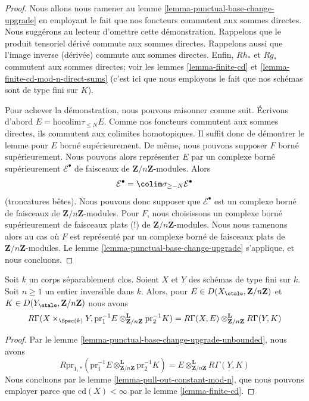 \begin{proof}
Nous allons nous ramener au
lemme \ref{lemma-punctual-base-change-upgrade}
en employant le fait que nos foncteurs commutent aux sommes directes.
Nous suggérons au lecteur d'omettre cette démonstration.
Rappelons que le produit tensoriel dérivé commute aux
sommes directes. Rappelons aussi que l'image inverse (dérivée) commute aux sommes directes.
Enfin, $Rh_*$ et $Rg_*$ commutent aux sommes directes; voir les
lemmes \ref{lemma-finite-cd} et
\ref{lemma-finite-cd-mod-n-direct-sums}
(c'est ici que nous employons le fait que nos schémas sont de type fini
sur $K$).

\medskip\noindent
Pour achever la démonstration, nous pouvons raisonner comme suit.
Écrivons d'abord $E = \text{hocolim} \tau_{\leq N} E$.
Comme nos foncteurs commutent aux sommes directes, ils commutent
aux colimites homotopiques. Il suffit donc de démontrer
le lemme pour $E$ borné supérieurement. De même, nous pouvons
supposer $F$ borné supérieurement.
Nous pouvons alors représenter $E$ par un complexe borné supérieurement
$\mathcal{E}^\bullet$ de faisceaux de $\mathbf{Z}/n\mathbf{Z}$-modules.
Alors
$$
\mathcal{E}^\bullet = \colim \sigma_{\geq -N}\mathcal{E}^\bullet
$$
(troncatures bêtes).
Nous pouvons donc supposer que $\mathcal{E}^\bullet$ est un complexe
borné de faisceaux de $\mathbf{Z}/n\mathbf{Z}$-modules.
Pour $F$, nous choisissons un complexe borné supérieurement de
faisceaux plats (!) de $\mathbf{Z}/n\mathbf{Z}$-modules.
Nous nous ramenons alors au cas où $F$ est représenté
par un complexe borné de faisceaux plats de $\mathbf{Z}/n\mathbf{Z}$-modules.
Le lemme \ref{lemma-punctual-base-change-upgrade}
s'applique, et nous concluons.
\end{proof}

\begin{lemma}
\label{lemma-kunneth}
Soit $k$ un corps séparablement clos. Soient $X$ et $Y$ des
schémas de type fini sur $k$. Soit $n \geq 1$ un entier
inversible dans $k$. Alors, pour
$E \in D(X_\etale, \mathbf{Z}/n\mathbf{Z})$ et
$K \in D(Y_\etale, \mathbf{Z}/n\mathbf{Z})$
nous avons
$$
R\Gamma(X \times_{\Spec(k)} Y,
\text{pr}_1^{-1}E
\otimes_{\mathbf{Z}/n\mathbf{Z}}^\mathbf{L}
\text{pr}_2^{-1}K
)
=
R\Gamma(X, E)
\otimes_{\mathbf{Z}/n\mathbf{Z}}^\mathbf{L}
R\Gamma(Y, K)
$$
\end{lemma}

\begin{proof}
Par le lemme \ref{lemma-punctual-base-change-upgrade-unbounded}, nous avons
$$
R\text{pr}_{1, *}(
\text{pr}_1^{-1}E
\otimes_{\mathbf{Z}/n\mathbf{Z}}^\mathbf{L}
\text{pr}_2^{-1}K) =
E \otimes_{\mathbf{Z}/n\mathbf{Z}}^\mathbf{L}
\underline{R\Gamma(Y, K)}
$$
Nous concluons par le
lemme \ref{lemma-pull-out-constant-mod-n},
que nous pouvons employer parce que
$\text{cd}(X) < \infty$ par le lemme \ref{lemma-finite-cd}.
\end{proof}














